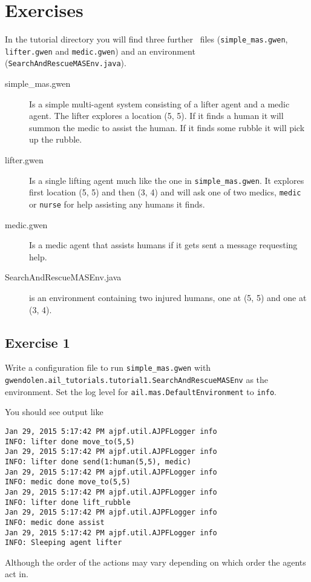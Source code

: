 \section{Exercises}
\begin{sloppypar}
In the tutorial directory you will find three further \gwendolen\ files (\texttt{simple\_mas.gwen}, \texttt{lifter.gwen} and \texttt{medic.gwen}) and an environment (\texttt{SearchAndRescueMASEnv.java}).
\end{sloppypar}
\begin{description}
\item[simple\_mas.gwen] Is a simple multi-agent system consisting of a lifter agent and a medic agent.  The lifter explores a location (5, 5).  If it finds a human it will summon the medic to assist the human.  If it finds some rubble it will pick up the rubble.
\item[lifter.gwen]Is a single lifting agent much like the one in \texttt{simple\_mas.gwen}.  It explores first location (5, 5) and then (3, 4) and will ask one of two medics, \texttt{medic} or \texttt{nurse} for help assisting any humans it finds.
\item[medic.gwen]Is a medic agent that assists humans if it gets sent a message requesting help.
\item[SearchAndRescueMASEnv.java] is an environment containing two injured humans, one at (5, 5) and one at (3, 4).
\end{description}

\subsection{Exercise 1}
\begin{sloppypar}
Write a configuration file to run \texttt{simple\_mas.gwen} with \texttt{gwendolen.ail\_tutorials.tutorial1.SearchAndRescueMASEnv} as the environment.  Set the log level for \texttt{ail.mas.DefaultEnvironment} to \texttt{info}.
\end{sloppypar}

You should see output like
\begin{verbatim}
Jan 29, 2015 5:17:42 PM ajpf.util.AJPFLogger info
INFO: lifter done move_to(5,5)
Jan 29, 2015 5:17:42 PM ajpf.util.AJPFLogger info
INFO: lifter done send(1:human(5,5), medic)
Jan 29, 2015 5:17:42 PM ajpf.util.AJPFLogger info
INFO: medic done move_to(5,5)
Jan 29, 2015 5:17:42 PM ajpf.util.AJPFLogger info
INFO: lifter done lift_rubble
Jan 29, 2015 5:17:42 PM ajpf.util.AJPFLogger info
INFO: medic done assist
Jan 29, 2015 5:17:42 PM ajpf.util.AJPFLogger info
INFO: Sleeping agent lifter
\end{verbatim}
Although the order of the actions may vary depending on which order the agents act in.

